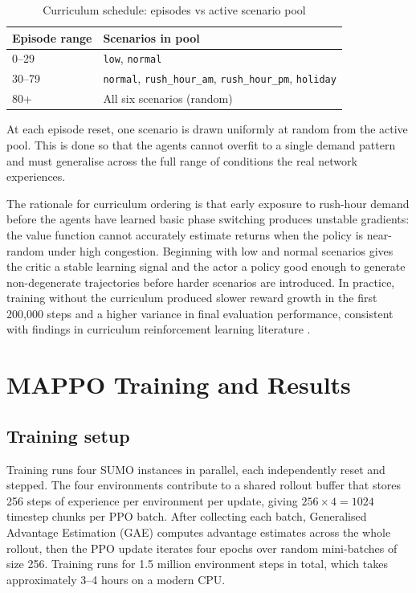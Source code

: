 ﻿\documentclass[11pt, a4paper]{report}
\begin{document}
\begin{table}[H]
\centering
\caption{Curriculum schedule: episodes vs active scenario pool}
\label{tab:curriculum}
\begin{tabular}{ll}
\toprule
\textbf{Episode range} & \textbf{Scenarios in pool} \\
\midrule
0--29 & \texttt{low}, \texttt{normal} \\
30--79 & \texttt{normal}, \texttt{rush\_hour\_am}, \texttt{rush\_hour\_pm}, \texttt{holiday} \\
80+ & All six scenarios (random) \\
\bottomrule
\end{tabular}
\end{table}

At each episode reset, one scenario is drawn uniformly at random from the active pool. This is done so that the agents cannot overfit to a single demand pattern and must generalise across the full range of conditions the real network experiences.

The rationale for curriculum ordering is that early exposure to rush-hour demand before the agents have learned basic phase switching produces unstable gradients: the value function cannot accurately estimate returns when the policy is near-random under high congestion. Beginning with low and normal scenarios gives the critic a stable learning signal and the actor a policy good enough to generate non-degenerate trajectories before harder scenarios are introduced. In practice, training without the curriculum produced slower reward growth in the first 200,000 steps and a higher variance in final evaluation performance, consistent with findings in curriculum reinforcement learning literature \cite{narvekar2020curriculum}.

\chapter{MAPPO Training and Results}
\label{chap:mappo_results}

\section{Training setup}

Training runs four SUMO instances in parallel, each independently reset and stepped. The four environments contribute to a shared rollout buffer that stores 256 steps of experience per environment per update, giving $256 \times 4 = 1024$ timestep chunks per PPO batch. After collecting each batch, Generalised Advantage Estimation (GAE) computes advantage estimates across the whole rollout, then the PPO update iterates four epochs over random mini-batches of size 256. Training runs for 1.5 million environment steps in total, which takes approximately 3--4 hours on a modern CPU.
\end{document}
